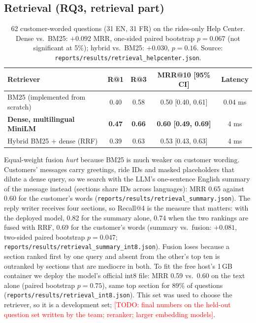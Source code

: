\documentclass[11pt,a4paper]{article}
\newcommand{\todo}[1]{\textcolor{red}{[TODO: #1]}}
\newcommand{\res}[1]{\texttt{\small reports/results/#1}}
\begin{document}
\subsection{Retrieval (RQ3, retrieval part)}
\begin{table}[h]
\centering\small
\begin{tabular}{lcccc}
\toprule
Retriever & R@1 & R@3 & MRR@10 [95\% CI] & Latency \\
\midrule
BM25 (implemented from scratch) & 0.40 & 0.58 & 0.50 [0.40, 0.61] & 0.04 ms \\
\textbf{Dense, multilingual MiniLM} & \textbf{0.47} & \textbf{0.66} & \textbf{0.60 [0.49, 0.69]} & 4 ms \\
Hybrid BM25 + dense (RRF) & 0.39 & 0.63 & 0.53 [0.43, 0.63] & 4 ms \\
\bottomrule
\end{tabular}
\caption{62 customer-worded questions (31 EN, 31 FR) on the rides-only Help Center. Dense vs.\
BM25: $+0.092$ MRR, one-sided paired bootstrap $p=0.067$ (not significant at 5\%); hybrid vs.\
BM25: $+0.030$, $p=0.16$. Source: \res{retrieval\_helpcenter.json}.}
\end{table}
Equal-weight fusion \emph{hurt} because BM25 is much weaker on customer wording. Customers' messages
carry greetings, ride IDs and masked placeholders that dilute a dense query, so we search with the
LLM's one-sentence English summary of the message instead (sections share IDs across languages):
MRR 0.65 against 0.60 for the customer's words (\res{retrieval\_summary.json}). The reply writer
receives four sections, so Recall@4 is the measure that matters: with the deployed model, 0.82 for
the summary alone, 0.74 when the two rankings are fused with RRF, 0.69 for the customer's words
(summary vs.\ fusion: $+0.081$, two-sided paired bootstrap $p=0.047$;
\res{retrieval\_summary\_int8.json}). Fusion loses because a section ranked first by one query
and absent from the other's top ten is outranked by sections that are mediocre in both. To fit the
free host's 1\,GB container we deploy the model's official int8 file: MRR 0.59 vs.\ 0.60 on the
text alone (paired bootstrap $p=0.75$), same top section for 89\% of questions
(\res{retrieval\_int8.json}). This set was
used to choose the retriever, so it is a development set; \todo{final numbers on the held-out
question set written by the team; reranker; larger embedding models}.
\end{document}
